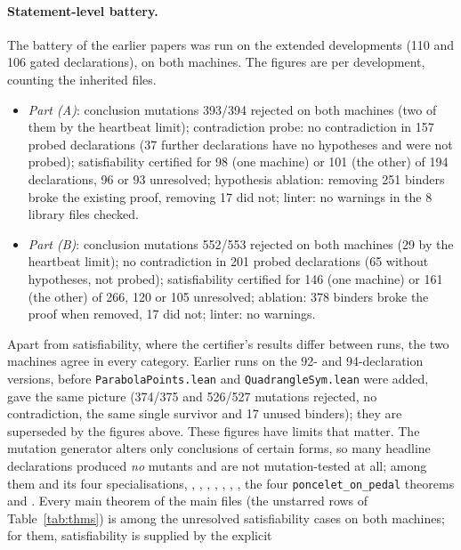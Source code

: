 \documentclass[11pt]{article}
\theoremstyle{definition}
\theoremstyle{remark}
\newcommand{\lean}[1]{\texttt{#1}}
\begin{document}
\paragraph{Statement-level battery.} The battery of the earlier papers was run on the extended
developments (110 and 106 gated declarations), on both machines. The figures are per development,
counting the inherited files.
\begin{itemize}
\item \emph{Part (A)}: conclusion mutations 393/394 rejected on both machines (two of them by the
heartbeat limit); contradiction probe: no contradiction in 157 probed declarations (37 further
declarations have no hypotheses and were not probed); satisfiability certified for 98 (one machine) or
101 (the other) of 194 declarations, 96 or 93 unresolved; hypothesis ablation: removing 251 binders broke
the existing proof, removing 17 did not; linter: no warnings in the 8 library files checked.
\item \emph{Part (B)}: conclusion mutations 552/553 rejected on both machines (29 by the heartbeat
limit); no contradiction in 201 probed declarations (65 without hypotheses, not probed); satisfiability
certified for 146 (one machine) or 161 (the other) of 266, 120 or 105 unresolved; ablation: 378 binders
broke the proof when removed, 17 did not; linter: no warnings.
\end{itemize}
Apart from satisfiability, where the certifier's results differ between runs, the two machines agree in
every category. Earlier runs on the 92- and 94-declaration versions, before \lean{ParabolaPoints.lean}
and \lean{QuadrangleSym.lean} were added, gave the same picture (374/375 and 526/527 mutations rejected,
no contradiction, the same single survivor and 17 unused binders); they are superseded by the figures above.
These figures have limits that matter. The mutation generator alters only conclusions of certain forms,
so many headline declarations produced \emph{no} mutants and are not mutation-tested at all; among them
 and its four specialisations, ,
, ,
, , ,
, the four \lean{poncelet\_on\_pedal} theorems and
. Every main theorem of the main files (the unstarred rows of Table~\ref{tab:thms}) is among the
unresolved satisfiability cases on both machines; for them, satisfiability is supplied by the explicit
\end{document}
